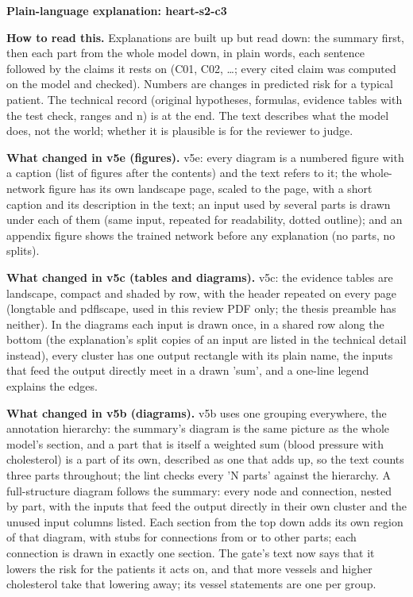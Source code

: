 \documentclass[a4paper,10pt]{article}
\begin{document}
\begin{center}{\Large\bfseries Plain-language explanation: heart-s2-c3\par}\vspace{2mm}{\small AI-assisted drafts for review. Nothing here has been verified by a person.\par}\end{center}
\noindent\textbf{How to read this.} Explanations are built up but read down: the summary first, then each part from the whole model down, in plain words, each sentence followed by the claims it rests on (C01, C02, \ldots; every cited claim was computed on the model and checked). Numbers are changes in predicted risk for a typical patient. The technical record (original hypotheses, formulas, evidence tables with the test check, ranges and n) is at the end. The text describes what the model does, not the world; whether it is plausible is for the reviewer to judge.
\par\medskip\noindent\textbf{What changed in v5e (figures).} v5e: every diagram is a numbered figure with a caption (list of figures after the contents) and the text refers to it; the whole-network figure has its own landscape page, scaled to the page, with a short caption and its description in the text; an input used by several parts is drawn under each of them (same input, repeated for readability, dotted outline); and an appendix figure shows the trained network before any explanation (no parts, no splits).
\par\medskip\noindent\textbf{What changed in v5c (tables and diagrams).} v5c: the evidence tables are landscape, compact and shaded by row, with the header repeated on every page (longtable and pdflscape, used in this review PDF only; the thesis preamble has neither). In the diagrams each input is drawn once, in a shared row along the bottom (the explanation's split copies of an input are listed in the technical detail instead), every cluster has one output rectangle with its plain name, the inputs that feed the output directly meet in a drawn 'sum', and a one-line legend explains the edges.
\par\medskip\noindent\textbf{What changed in v5b (diagrams).} v5b uses one grouping everywhere, the annotation hierarchy: the summary's diagram is the same picture as the whole model's section, and a part that is itself a weighted sum (blood pressure with cholesterol) is a part of its own, described as one that adds up, so the text counts three parts throughout; the lint checks every 'N parts' against the hierarchy. A full-structure diagram follows the summary: every node and connection, nested by part, with the inputs that feed the output directly in their own cluster and the unused input columns listed. Each section from the top down adds its own region of that diagram, with stubs for connections from or to other parts; each connection is drawn in exactly one section. The gate's text now says that it lowers the risk for the patients it acts on, and that more vessels and higher cholesterol take that lowering away; its vessel statements are one per group.
\end{document}
